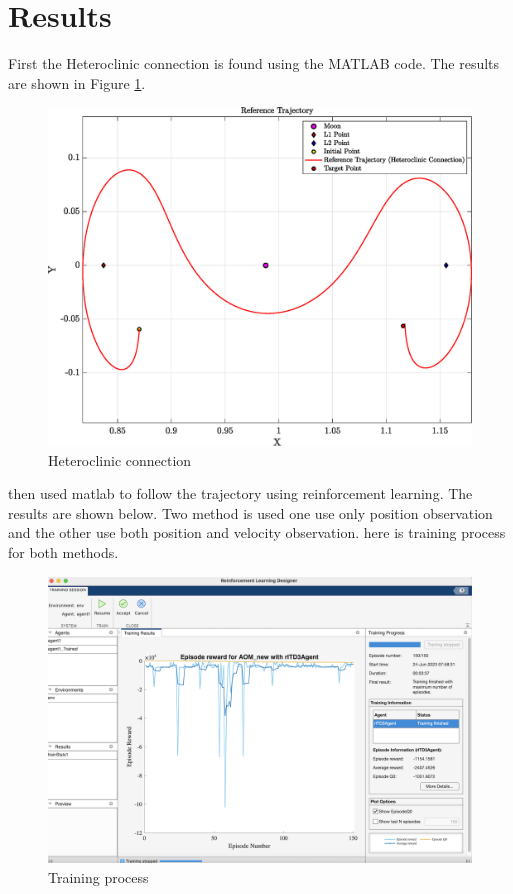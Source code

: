 \documentclass{article}
\begin{document}
\section{Results}
First the Heteroclinic connection is found using the MATLAB code. The results are shown in Figure \ref{fig:hetcon}.
\begin{figure}[H]
	\centering
	\includegraphics[width=\textwidth]{trajectory}
	\caption{Heteroclinic connection}
	\label{fig:hetcon}
\end{figure}
then used matlab to follow the trajectory using reinforcement learning. The results are shown below.
Two method is used one use only position observation and the other use both position and velocity observation.
here is training process for both methods.
\begin{figure}[H]
	\centering
	\includegraphics[width=\textwidth]{training.png}
	\caption{Training process}
	\label{fig:training}
\end{figure}
\end{document}
